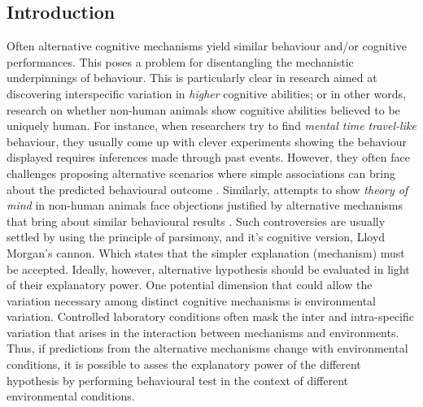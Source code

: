 \documentclass[]{rsos}%
\begin{document}
\providecommand{\EndFirstPage}{%
}

\maketitle

\hypertarget{introduction}{%
\subsection{Introduction}\label{introduction}}

Often alternative cognitive mechanisms yield similar behaviour and/or cognitive
performances. This poses a problem for disentangling the mechanistic
underpinnings of behaviour. This is particularly clear in research aimed at
discovering interspecific variation in \emph{higher} cognitive abilities; or
in other words, research on whether non-human animals show cognitive
abilities believed to be uniquely human. For instance, when researchers
try to find \emph{mental time travel-like} behaviour, they usually come up with
clever experiments showing the behaviour displayed requires inferences made
through past events\citep{dally_Foodcaching_2006}. However, they often face challenges proposing alternative scenarios where simple associations can bring about the
predicted behavioural outcome \citep{suddendorf_Evolution_2007}. Similarly, attempts
to show \emph{theory of mind} in non-human animals face objections
justified by alternative mechanisms that bring about similar behavioural
results \citep{heyes_Theory_1998}. Such controversies are usually settled by
using the principle of parsimony, and it's cognitive version,
Lloyd Morgan's cannon. Which states that the simpler explanation (mechanism)
must be accepted. Ideally, however, alternative hypothesis should be evaluated
in light of their explanatory power. One potential dimension that could allow
the variation necessary among distinct cognitive mechanisms is environmental
variation. Controlled laboratory conditions often mask the inter and
intra-specific variation that arises in the interaction between mechanisms and
environments. Thus, if predictions from the alternative mechanisms change
with environmental conditions, it is possible to asses the explanatory power
of the different hypothesis by performing behavioural test in the context of
different environmental conditions.
\end{document}
